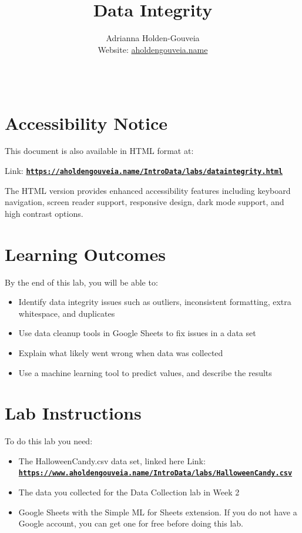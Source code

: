 \documentclass[12pt]{article}
\title{Data Integrity}
\author{
        Adrianna Holden-Gouveia \\
        Website: \href{https://aholdengouveia.name}{aholdengouveia.name}\\ 
        \date{\vspace{-5ex}}
        \faGithub {: aholdengouveia} \\
        }
\begin{document}
    

\maketitle



\section*{Accessibility Notice}
This document is also available in HTML format at:

Link: \href{https://aholdengouveia.name/IntroData/labs/dataintegrity.html}{\textbf{\nolinkurl{https://aholdengouveia.name/IntroData/labs/dataintegrity.html}}}

The HTML version provides enhanced accessibility features including keyboard navigation, screen reader support, responsive design, dark mode support, and high contrast options.

\section*{Learning Outcomes}
By the end of this lab, you will be able to:
\begin{itemize}
    \item Identify data integrity issues such as outliers, inconsistent formatting, extra whitespace, and duplicates
    \item Use data cleanup tools in Google Sheets to fix issues in a data set
    \item Explain what likely went wrong when data was collected
    \item Use a machine learning tool to predict values, and describe the results
\end{itemize}

\section*{Lab Instructions}


To do this lab you need:
\begin{itemize}
    \item The HalloweenCandy.csv data set, linked here Link: \href{https://www.aholdengouveia.name/IntroData/labs/HalloweenCandy.csv}{\textbf{\nolinkurl{https://www.aholdengouveia.name/IntroData/labs/HalloweenCandy.csv}}}
    \item The data you collected for the Data Collection lab in Week 2
    \item Google Sheets with the Simple ML for Sheets extension. If you do not have a Google account, you can get one for free before doing this lab.
\end{itemize}
\end{document}

